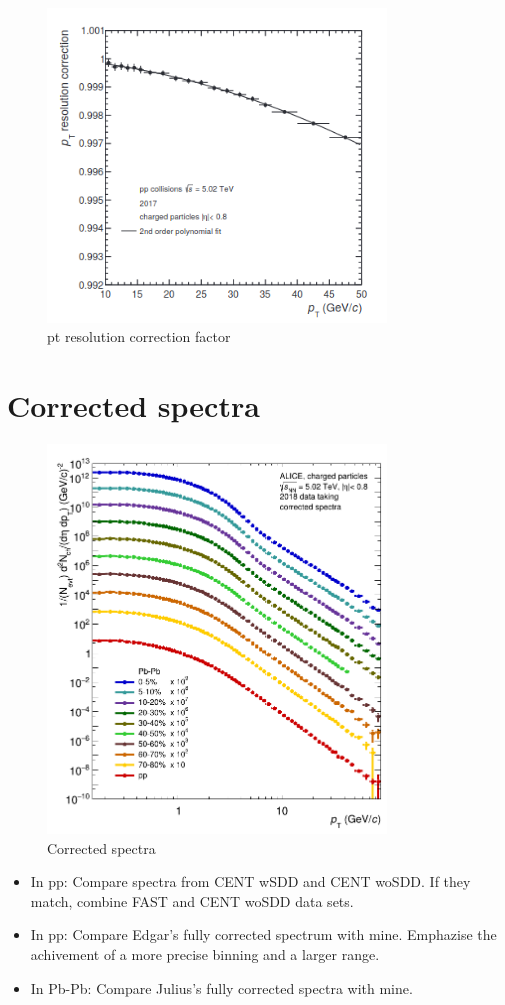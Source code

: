 \documentclass[12pt,a4paper]{report}
\begin{document}
\begin{figure}[tb!]
\centering
\includegraphics[width=9cm]{Plots/ptresolutionCorrFactor.png}
\caption{pt resolution correction factor} 
  
\end{figure}


\section{Corrected \pt spectra}
\begin{figure}[tb!]
\centering
\includegraphics[width=9cm]{Plots/corrSpectra.png}  
\caption{Corrected \pt spectra}
\end{figure}
\begin{itemize}
\item In pp: Compare \pt spectra from CENT wSDD and CENT woSDD. If they match, combine FAST and CENT woSDD data sets.
\item In pp: Compare Edgar's fully corrected spectrum with mine. Emphazise the achivement of a more precise binning and a larger range.
\item In Pb-Pb: Compare Julius's fully corrected spectra with mine.
\end{itemize}
\end{document}
